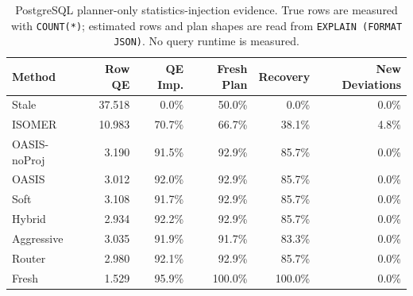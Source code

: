 \begin{table}[t]
  \centering
  \small
  \caption{PostgreSQL planner-only statistics-injection evidence. True rows are measured with \texttt{COUNT(*)}; estimated rows and plan shapes are read from \texttt{EXPLAIN (FORMAT JSON)}. No query runtime is measured.}
  \label{tab:postgres_planner_stats_injection}
  \setlength{\tabcolsep}{4pt}
  \begin{tabular}{lrrrrr}
    \toprule
    Method & Row QE & QE Imp. & Fresh Plan & Recovery & New Deviations \\
    \midrule
    Stale & 37.518 & 0.0\% & 50.0\% & 0.0\% & 0.0\% \\
    ISOMER & 10.983 & 70.7\% & 66.7\% & 38.1\% & 4.8\% \\
    OASIS-noProj & 3.190 & 91.5\% & 92.9\% & 85.7\% & 0.0\% \\
    OASIS & 3.012 & 92.0\% & 92.9\% & 85.7\% & 0.0\% \\
    Soft & 3.108 & 91.7\% & 92.9\% & 85.7\% & 0.0\% \\
    Hybrid & 2.934 & 92.2\% & 92.9\% & 85.7\% & 0.0\% \\
    Aggressive & 3.035 & 91.9\% & 91.7\% & 83.3\% & 0.0\% \\
    Router & 2.980 & 92.1\% & 92.9\% & 85.7\% & 0.0\% \\
    Fresh & 1.529 & 95.9\% & 100.0\% & 100.0\% & 0.0\% \\
    \bottomrule
  \end{tabular}
\end{table}
